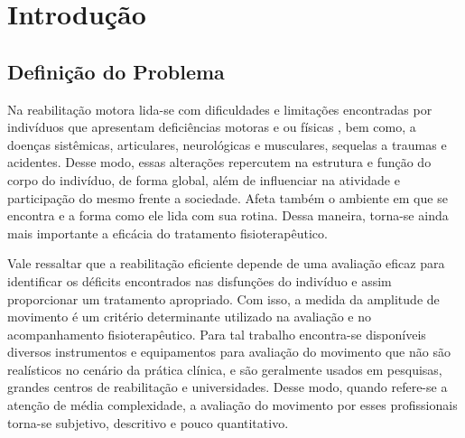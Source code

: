 \chapter*[Introdução]{Introdução}

\section{Definição do Problema}       
\label{Sec:DefinicaoProblema}

  Na reabilitação motora lida-se com dificuldades e limitações encontradas por 
indivíduos que apresentam deficiências motoras e ou físicas , bem como, 
 a doenças sistêmicas, articulares, neurológicas e musculares, sequelas a 
traumas e acidentes.  Desse modo, essas alterações repercutem 
 na estrutura e função do corpo do indivíduo, de forma global, além de
influenciar na atividade e participação do mesmo frente a sociedade. Afeta 
também o ambiente em que se encontra e a forma como ele lida com sua rotina. 
Dessa maneira, torna-se ainda mais importante a eficácia do tratamento 
fisioterapêutico.
                                                                                 
  Vale ressaltar que  a reabilitação eficiente depende de uma avaliação eficaz
 para identificar os déficits encontrados nas disfunções do indivíduo e assim 
proporcionar um tratamento apropriado. Com isso, a medida da amplitude de 
movimento é  um critério determinante utilizado na avaliação e no 
acompanhamento fisioterapêutico. Para tal trabalho encontra-se disponíveis 
diversos instrumentos e equipamentos para avaliação do movimento que  
não são realísticos no cenário da prática clínica, e são geralmente usados em 
pesquisas, grandes centros de reabilitação e universidades. 
  Desse modo, quando refere-se a atenção de média complexidade, a avaliação do movimento por 
esses profissionais torna-se subjetivo, descritivo e pouco 
quantitativo.

